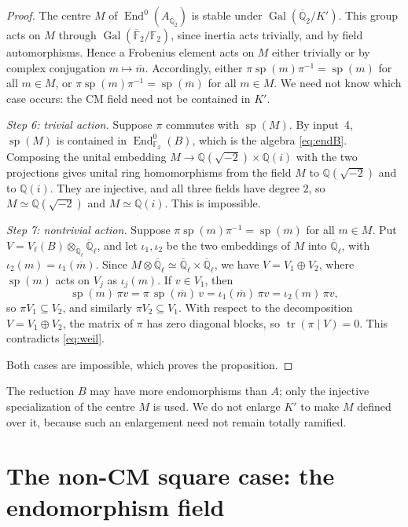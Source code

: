 \documentclass[11pt]{article}
\newcommand{\Q}{\mathbb Q}
\newcommand{\F}{\mathbb F}
\DeclareMathOperator{\End}{End}
\DeclareMathOperator{\Gal}{Gal}
\DeclareMathOperator{\tr}{tr}
\DeclareMathOperator{\spe}{sp}
\begin{document}
\begin{proof}
The centre \(M\) of \(\End^0(A_{\overline{\Q}_2})\) is stable under
\(\Gal(\overline{\Q}_2/K')\). This group acts on \(M\) through
\(\Gal(\overline{\F}_2/\F_2)\), since inertia acts trivially, and by
field automorphisms. Hence a Frobenius element acts on \(M\) either
trivially or by complex conjugation \(m\mapsto\overline m\).
Accordingly, either \(\pi\spe(m)\pi^{-1}=\spe(m)\) for all \(m\in M\),
or \(\pi\spe(m)\pi^{-1}=\spe(\overline m)\) for all \(m\in M\). We need
not know which case occurs: the CM field need not be contained in
\(K'\).

\emph{Step 6: trivial action.} Suppose \(\pi\) commutes with
\(\spe(M)\). By input~4, \(\spe(M)\) is contained in
\(\End^0_{\F_2}(B)\), which is the algebra \eqref{eq:endB}. Composing
the unital embedding \(M\to\Q(\sqrt{-2})\times\Q(i)\) with the two
projections gives unital ring homomorphisms from the field \(M\) to
\(\Q(\sqrt{-2})\) and to \(\Q(i)\). They are injective, and all three
fields have degree \(2\), so \(M\simeq\Q(\sqrt{-2})\) and
\(M\simeq\Q(i)\). This is impossible.

\emph{Step 7: nontrivial action.} Suppose
\(\pi\spe(m)\pi^{-1}=\spe(\overline m)\) for all \(m\in M\). Put
\(V=V_\ell(B)\otimes_{\Q_\ell}\overline{\Q}_\ell\), and let
\(\iota_1,\iota_2\) be the two embeddings of \(M\) into
\(\overline{\Q}_\ell\), with \(\iota_2(m)=\iota_1(\overline m)\).
Since \(M\otimes\overline{\Q}_\ell\simeq\overline{\Q}_\ell\times
\overline{\Q}_\ell\), we have \(V=V_1\oplus V_2\), where \(\spe(m)\)
acts on \(V_j\) as \(\iota_j(m)\). If \(v\in V_1\), then
\[
 \spe(m)\,\pi v=\pi\,\spe(\overline m)\,v=\iota_1(\overline m)\,\pi v
 =\iota_2(m)\,\pi v,
\]
so \(\pi V_1\subseteq V_2\), and similarly \(\pi V_2\subseteq V_1\).
With respect to the decomposition \(V=V_1\oplus V_2\), the matrix of
\(\pi\) has zero diagonal blocks, so \(\tr(\pi\mid V)=0\). This
contradicts \eqref{eq:weil}.

Both cases are impossible, which proves the proposition.
\end{proof}

The reduction \(B\) may have more endomorphisms than \(A\); only the
injective specialization of the centre \(M\) is used. We do not enlarge
\(K'\) to make \(M\) defined over it, because such an enlargement need
not remain totally ramified.

\section{The non-CM square case: the endomorphism field}
\label{sec:endfield}
\end{document}
